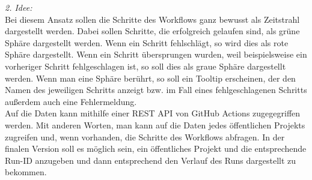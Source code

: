 \documentclass{article}
\begin{document}
\emph{2. Idee:}\\[0pt]
Bei diesem Ansatz sollen die Schritte des Workflows ganz bewusst als Zeitstrahl dargestellt werden. Dabei sollen Schritte, die erfolgreich gelaufen sind, als grüne Sphäre dargestellt werden. Wenn ein Schritt fehlschlägt, so wird dies als rote Sphäre dargestellt. Wenn ein Schritt übersprungen wurden, weil beispielsweise ein vorheriger Schritt fehlgeschlagen ist, so soll dies als graue Sphäre dargestellt werden. Wenn man eine Sphäre berührt, so soll ein Tooltip erscheinen, der den Namen des jeweiligen Schritts anzeigt bzw. im Fall eines fehlgeschlagenen Schritts außerdem auch eine Fehlermeldung.\\[0pt]
Auf die Daten kann mithilfe einer REST API von GitHub Actions zugegegriffen werden. Mit anderen Worten, man kann auf die Daten jedes öffentlichen Projekts zugreifen und, wenn vorhanden, die Schritte des Workflows abfragen. In der finalen Version soll es möglich sein, ein öffentliches Projekt und die entsprechende Run-ID anzugeben und dann entsprechend den Verlauf des Runs dargestellt zu bekommen.
\end{document}
